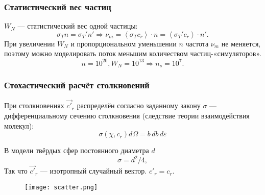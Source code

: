 \documentclass[onlymath]{beamer}
\newcommand\avg[1]{\left\langle{#1}\right\rangle}
\renewcommand\epsilon\varepsilon
\newcommand{\statw}{W_N}
\newcommand{\cf}{\nu_m}
\newcommand{\ccs}{\sigma_T}
\newcommand\then{\Rightarrow}
\begin{document}
\begin{frame}
  \frametitle{Статистический вес частиц}
  $\statw$ — статистический вес одной частицы:
  \begin{equation*}
    \ccs n = \ccs' n' \then \cf = \avg{\ccs c_r} \cdot n = \avg{\ccs' c_r} \cdot n'.
  \end{equation*}
  При увеличении $\statw$ и пропорциональном уменьшении $n$ частота
  $\cf$ не меняется, поэтому можно моделировать поток меньшим
  количеством частиц-«симуляторов».
  \begin{equation*}
    n = 10^{20}, W_N = 10^{13} \then n_s = 10^7.
  \end{equation*}
\end{frame}

\begin{frame}
  \frametitle{Стохастический расчёт столкновений}
  При столкновениях $\vec{c'}_r$ распределён согласно заданному закону
  $\sigma$ — дифференциальному сечению столкновения (следствие теории
  взаимодействия молекул):
  \begin{equation*}
    \sigma(\chi,c_r) d\Omega = b\,db\,d\epsilon
  \end{equation*}

  В модели твёрдых сфер постоянного диаметра $d$
  \begin{equation*}
    \sigma = d^2/4,
  \end{equation*}
  Так что $\vec{c'}_r$ — изотропный случайный вектор. $c'_r = c_r$.
  \begin{figure}[!h]
    \centering
    \texttt{[image: scatter.png]}
  \end{figure}
\end{frame}
\end{document}
